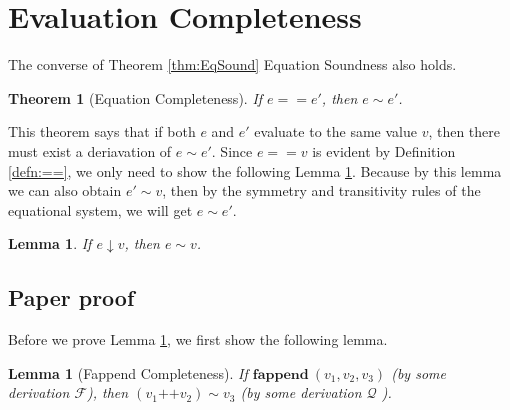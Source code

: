 \documentclass[a4paper]{article}
\newtheorem{thm}[equation]{Theorem}
\newtheorem{lem}[equation]{Lemma}
\theoremstyle{plain}
\def\DA{\downarrow}
\def\*#1{\mathbf{#1}\ }
\def\Q{\mathcal{Q}}
\def\F{\mathcal{F}}
\def\PP{\operatorname{++}}
\begin{document}
\section{Evaluation Completeness}

The converse of Theorem \ref{thm:EqSound} Equation Soundness also holds.

\begin{thm}[Equation Completeness]
	If $e == e'$, then $e \sim e'$.
\end{thm}

This theorem says that if both $e$ and $e'$ evaluate to the same value $v$, then there must exist a deriavation of $e \sim e'$. Since $e == v$ is evident by Definition \ref{defn:==}, we only need to show the following Lemma \ref{lem:completeness}. Because by this lemma we can also obtain $e' \sim v$, then by the symmetry and transitivity rules of the equational system, we will get $e \sim e'$.
 
\begin{lem}
	If $e \DA v$, then $e \sim v$.
	\label{lem:completeness}
\end{lem}

\subsection{Paper proof}

Before we prove Lemma \ref{lem:completeness}, we first show the following lemma.

\begin{lem}[Fappend Completeness]
	If $\*{fappend}(v_1, v_2,v_3)$ (by some derivation $\F$), then $(v_1 \PP v_2) \sim v_3$ (by some derivation $\Q$ ).
\label{lem:fappend-complt}
\end{lem}
\end{document}
